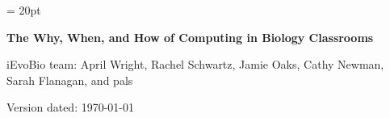 \documentclass[11pt]{article}
\begin{document}
\renewcommand{\headrulewidth}{0.5pt}
\headsep = 20pt
\lhead{ }

\thispagestyle{plain}
\begin{center}

\textbf{\LARGE The Why, When, and How of Computing in Biology Classrooms}\\\vspace{2mm}

\vspace{1cm}
{\Large iEvoBio team: April Wright, Rachel Schwartz, Jamie Oaks, Cathy Newman, Sarah Flanagan, and pals}
\vspace{1cm}
\end{center}

\def \ResourcePath {./}
\def \GlobalResourcePath {.}


Version dated: \today
\end{document}
